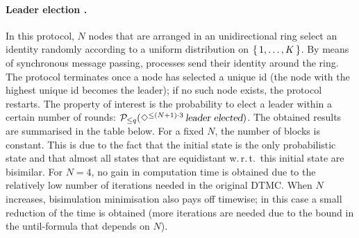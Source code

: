 \documentclass{llncs}
\begin{document}
\paragraph{Leader election \cite{ItaiR_IC90}.}
In this protocol, $N$ nodes that are arranged in an unidirectional ring select
an identity randomly according to a uniform distribution on $\{ \, 1, \ldots, K \, \}$.
By means of synchronous message passing, processes send their identity around
the ring.  The protocol terminates once a node has selected a unique id (the 
node with the highest unique id becomes the leader); if no such node exists, the 
protocol restarts.
The property of interest is the probability to elect a leader
within a certain number of rounds: ${\cal P}_{\leq q}(\Diamond^{\leq (N{+}1){\cdot}3} \, 
\mbox{\sl leader elected})$.
The obtained results are summarised in the table below.
For a fixed $N$, the number of blocks is constant.
This is due to the fact that the initial state is the only probabilistic state 
and that almost all states that are equidistant w.\,r.\,t.\ this initial state are bisimilar.
For $N = 4$, no gain in computation time is obtained due to the relatively 
low number of iterations needed in the original DTMC.
When $N$ increases, bisimulation minimisation also pays off timewise; in this
case a small reduction of the time is obtained (more iterations are needed
due to the bound in the until-formula that depends on $N$). 
\end{document}
